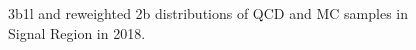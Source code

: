 \begin{figure}[ht]
 

    \caption{3b1l and reweighted 2b distributions of QCD and \ttbar MC samples in Signal Region in 2018.}
    \label{fig:data-weights-3b1l-SR-2018}
\end{figure}


